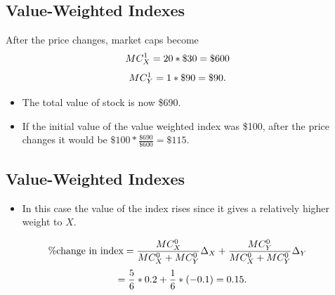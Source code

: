 \documentclass[letterpaper,10pt,english]{sphinxmanual}
\begin{document}
\subsection{Value-Weighted Indexes}
\label{indexes:id5}
After the price changes, market caps become
\begin{gather}
\begin{split}MC^1_X & = 20 * \$30 = \$600\end{split}\notag
\end{gather}\begin{gather}
\begin{split}MC^1_Y & = 1*\$90=\$90.\end{split}\notag
\end{gather}\begin{itemize}
\item {} 
The total value of stock is now \$690.

\end{itemize}
\begin{itemize}
\item {} 
If the initial value of the value weighted index was \$100, after
the price changes it would be $\$100*\frac{\$690}{\$600} =
\$115$.

\end{itemize}


\subsection{Value-Weighted Indexes}
\label{indexes:id6}\begin{itemize}
\item {} 
In this case the value of the index rises since it gives a
relatively higher weight to $X$.

\end{itemize}
\begin{gather}
\begin{split}\% \text{change in index} & = \frac{MC^0_X}{MC^0_X + MC^0_Y}
\Delta_X + \frac{MC^0_Y}{MC^0_X + MC^0_Y} \Delta_Y\end{split}\notag
\end{gather}\begin{gather}
\begin{split}= \frac{5}{6} * 0.2 + \frac{1}{6} * (-0.1) = 0.15.\end{split}\notag
\end{gather}
\end{document}
